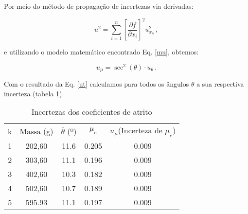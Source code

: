 \documentclass[12pt]{article}
\numberwithin{equation}{section} %
\begin{document}
Por meio do método de propagação de incertezas via derivadas:

\begin{equation}
\label{der}
u^2=\sum_{i=1}^{n}\left[\frac{\partial f}{\partial x_{i}}\right]^2u_{x_{n}}^2    \,,
\end{equation}

e utilizando o modelo matemático encontrado Eq. \eqref{mu}, obtemos:

\begin{equation}
\label{ut}
u_{\mu}=\sec^2(\theta) \cdot  u_{\theta}\,.
\end{equation}

Com o resultado da Eq. \eqref{ut} calculamos para todos os ângulos $\overline{\theta}$  a sua respectiva incerteza (tabela \ref{incerteza}).

\begin{table}[H]
\centering
\begin{tabular}{|c|c|c|c|c|}
\hline
\multirow{2}{*}{k} & \multirow{2}{*}{Massa (g)} & \multirow{2}{*}{$\overline{\theta}$  (º)} & \multirow{2}{*}{$\mu_{e}$} & \multirow{2}{*}{$u_{\mu}$(Incerteza de $\mu_{e}$)} \\
                   &                            &                                           &                            &                                         \\ \hline
1                  & 202,60                     & 11.6                                      & 0.205                    & 0.009                                 \\ \hline
2                  & 303,60                     & 11.1                                      & 0.196                    & 0.009                                 \\ \hline
3                  & 402,60                     & 10.3                                     & 0.182                    & 0.009                                 \\ \hline
4                  & 502,60                     & 10.7                                     & 0.189                    & 0.009                                 \\ \hline
5                  & 595.93                     & 11.1                                     & 0.197                    & 0.009                                 \\ \hline
\end{tabular}
\caption{Incertezas dos coeficientes de atrito}
\label{incerteza}
\end{table}
\end{document}
